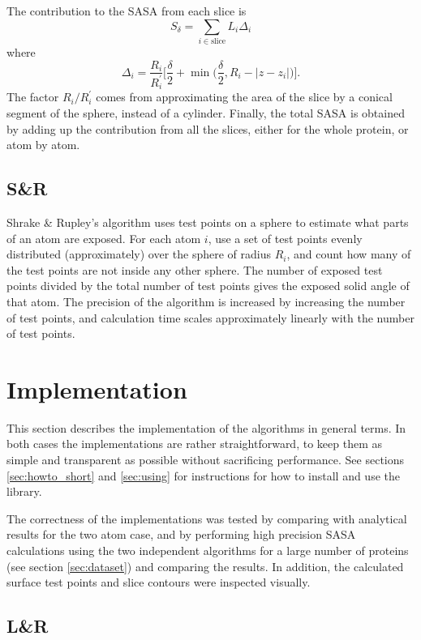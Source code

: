 \documentclass[a4paper,11pt]{article}
\begin{document}
The contribution to the SASA from each slice is $$ S_\delta =
\sum_{i \in \text{slice}}L_i\Delta_i $$ where
$$
  \Delta_i = \frac{R_i}{R_i^\prime} \biggl[\frac{\delta}{2} 
    + \min\biggl(\frac{\delta}{2},R_i -
    \lvert z - z_i \rvert\biggr)\biggr]. 
$$ 
The factor $R_i/R_i^\prime$ comes from approximating the area of the
slice by a conical segment of the sphere, instead of a cylinder.
Finally, the total SASA is obtained by adding up the contribution from
all the slices, either for the whole protein, or atom by atom.


\subsection{S\&R}

Shrake \& Rupley's algorithm uses test points on a sphere to estimate
what parts of an atom are exposed. For each atom $i$, use a set of
test points evenly distributed (approximately) over the sphere of
radius $R_i$, and count how many of the test points are not inside any
other sphere. The number of exposed test points divided by the total
number of test points gives the exposed solid angle of that atom. The
precision of the algorithm is increased by increasing the number of
test points, and calculation time scales approximately linearly with
the number of test points.


\section{Implementation}\label{sec:imp}

This section describes the implementation of the algorithms in general
terms. In both cases the implementations are rather straightforward,
to keep them as simple and transparent as possible without sacrificing
performance. See sections \ref{sec:howto_short} and \ref{sec:using}
for instructions for how to install and use the library.

The correctness of the implementations was tested by comparing with
analytical results for the two atom case, and by performing high
precision SASA calculations using the two independent algorithms for a
large number of proteins (see section \ref{sec:dataset}) and comparing
the results. In addition, the calculated surface test
points and slice contours were inspected visually.

\subsection{L\&R}
\end{document}

